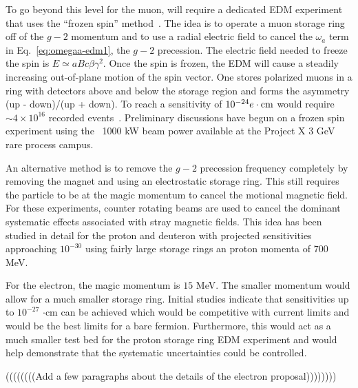 To go beyond this level for the muon, will require a dedicated EDM experiment that
uses
the ``frozen spin'' method~\cite{Farley04,Roberts2010}.
 The idea is to operate a
muon storage ring off of the  $g-2$ momentum and to use a radial electric field
to cancel the $\omega_a$ term in Eq.~\ref{eq:omegaa-edm1},
 the $g-2$ precession.  The  electric field needed to freeze the spin is
$E \simeq aBc\beta\gamma^2$.
Once the spin is frozen, the EDM will cause a steadily increasing
out-of-plane motion of the spin vector. One stores polarized muons in a ring
with detectors above and below the storage region and forms the asymmetry
(up - down)/(up + down).  To reach a sensitivity of $10^{-24}e \cdot {\rm cm}$ would
require $\sim 4 \times 10^{16}$ recorded events~\cite{Farley04}.
 Preliminary discussions have begun on a frozen spin experiment
using the ~1000 kW beam power available at the Project X 3 GeV rare process campus.

An alternative method is to remove the $g-2$ precession frequency completely by removing 
the magnet and using an electrostatic storage ring. This still requires the particle to be at the 
magic momentum to cancel the motional magnetic field.  For these experiments, counter rotating 
beams are used to cancel the dominant systematic effects associated with stray magnetic fields.  
This idea has been studied in detail for the proton and deuteron with projected sensitivities approaching $10^{-30}$ 
using fairly large storage rings an proton momenta of $700$ MeV.

For the electron, the magic momentum is $15$ MeV.  The smaller momentum would allow for a
 much smaller storage ring.  Initial studies indicate that sensitivities up to $10^{-27}$ $\cdot $cm 
 can be achieved which would be competitive with current limits and would be the best limits for a
  bare fermion.  Furthermore, this would act as a much smaller test bed for the proton storage ring EDM experiment and would 
  help demonstrate that the systematic uncertainties could be controlled.
  
((((((((Add a few paragraphs about the details of the electron proposal))))))))


